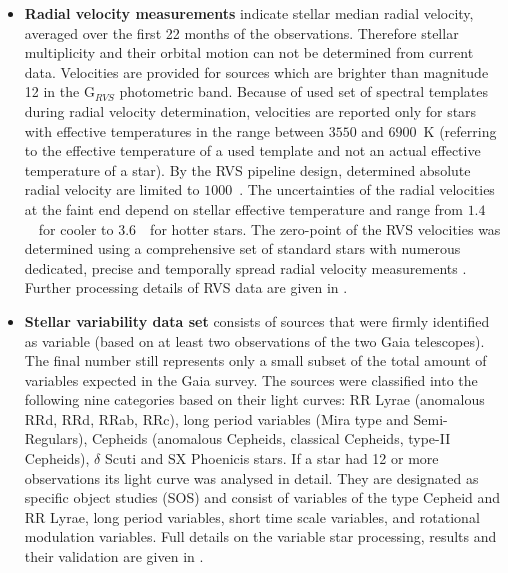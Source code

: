 \begin{itemize}
	\item \textbf{Radial velocity measurements} indicate stellar median radial velocity, averaged over the first 22 months of the observations. Therefore stellar multiplicity and their orbital motion can not be determined from current data. Velocities are provided for sources which are brighter than magnitude 12 in the G$_{RVS}$ photometric band. Because of used set of spectral templates during radial velocity determination, velocities are reported only for stars with effective temperatures in the range between $3550$ and $6900$~K (referring to the effective temperature of a used template and not an actual effective temperature of a star). By the RVS pipeline design, determined absolute radial velocity are limited to $1000$~\kms. The uncertainties of the radial velocities at the faint end depend on stellar effective temperature and range from $1.4$~\kms\ for cooler to $3.6$~\kms\ for hotter stars. The zero-point of the RVS velocities was determined using a comprehensive set of standard stars with numerous dedicated, precise and temporally spread radial velocity measurements \citep{2018A&A...616A...7S}. Further processing details of RVS data are given in \citet{2018A&A...616A...6S}.
	
	\item \textbf{Stellar variability data set} consists of sources that were firmly identified as variable (based on at least two observations of the two Gaia telescopes). The final number still represents only a small subset of the total amount of variables expected in the Gaia survey. The sources were classified into the following nine categories based on their light curves: RR Lyrae (anomalous RRd, RRd, RRab, RRc), long period variables (Mira type and Semi-Regulars), Cepheids (anomalous Cepheids, classical Cepheids, type-II Cepheids), $\delta$ Scuti and SX Phoenicis stars. If a star had 12 or more observations its light curve was analysed in detail. They are designated as specific object studies (SOS) and consist of variables of the type Cepheid
	and RR Lyrae, long period variables, short time scale variables, and rotational modulation variables. Full details on the variable star processing, results and their validation are given in \citet{2018A&A...618A..30H, 2018A&A...618A..58M, 2018A&A...620A.127M, 2019A&A...622A..60C}.
	

\end{itemize}
